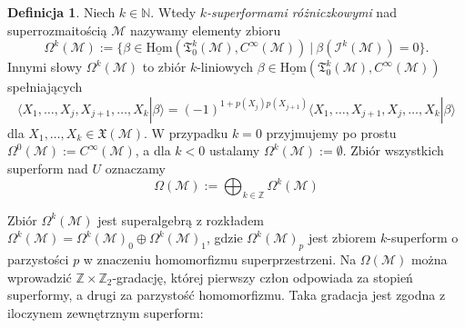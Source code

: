 \documentclass[11pt,a4paper]{report}
\theoremstyle{definition}
\newtheorem{definition}[theorem]{Definicja}
\begin{document}
\begin{definition}
	Niech $k \in \mathbb{N}$. Wtedy \textit{$k$-superformami różniczkowymi} nad superrozmaitością $\mathcal{M}$ nazywamy elementy zbioru
	\begin{equation*}
		\Omega^k (\mathcal{M}) := \{ \beta \in \underline{\mathrm{Hom}} (\mathfrak T^k_0(\mathcal{M}), C^\infty(\mathcal{M})) \ |\ \beta (\mathcal{I}^k\mathcal{(M)}) = 0\}.
	\end{equation*}
	Innymi słowy $\Omega^k (\mathcal{M})$ to zbiór $k$-liniowych $\beta \in \underline{\mathrm{Hom}} (\mathfrak T^k_0(\mathcal{M}), C^\infty(\mathcal{M}))$ spełniających
	\begin{equation*}
		\langle X_1,\ldots, X_j,X_{j+1},\ldots,X_k|\beta\rangle=(-1)^{1+p(X_j)p(X_{j+1})}\langle X_1,\ldots,X_{j+1},X_j,\ldots,X_k|\beta\rangle
	\end{equation*}
	dla $X_1, \ldots, X_k \in \mathfrak{X} (\mathcal{M})$. W przypadku $k=0$ przyjmujemy po prostu $\Omega^0 (\mathcal{M}) := C^\infty(\mathcal{M})$, a dla $k < 0$ ustalamy $\Omega^k (\mathcal{M}) := \emptyset$. Zbiór wszystkich superform nad $U$ oznaczamy
	\begin{equation*}
		\Omega (\mathcal{M}) := \bigoplus_{k \in \mathbb{Z}} \Omega^k (\mathcal{M})
	\end{equation*}
\end{definition}
		      			
Zbiór $\Omega^k (\mathcal{M})$ jest superalgebrą z rozkładem $\Omega^k (\mathcal{M}) =\Omega^k (\mathcal{M})_0 \oplus \Omega^k (\mathcal{M})_1$, gdzie $\Omega^k (\mathcal{M})_p$ jest zbiorem $k$-superform o parzystości $p$ w znaczeniu homomorfizmu superprzestrzeni. Na $\Omega(\mathcal{M})$ można wprowadzić $\mathbb{Z}\times \mathbb{Z}_2$-gradację, której pierwszy człon odpowiada za stopień superformy, a drugi za parzystość homomorfizmu. Taka gradacja jest zgodna z iloczynem zewnętrznym superform:
		      			
\end{document}
